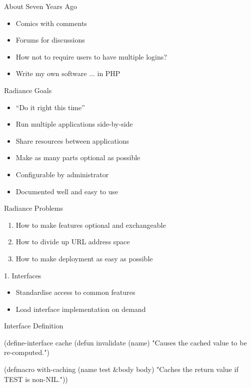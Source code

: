 \documentclass[14pt,t]{beamer}
\renewcommand{\title}[1]{
  {\huge #1} \vskip 0.4cm
}
\begin{document}
\begin{frame}
  \title{About Seven Years Ago}
  \begin{itemize}
  \item Comics with comments
  \item Forums for discussions
  \item How not to require users to have multiple logins?
  \item Write my own software \pause ... in PHP
  \end{itemize}
\end{frame}

\begin{frame}
  \title{Radiance Goals}
  \begin{itemize}
  \item ``Do it right this time''
  \item Run multiple applications side-by-side
  \item Share resources between applications
  \item Make as many parts optional as possible
  \item Configurable by administrator
  \item Documented well and easy to use
  \end{itemize}
\end{frame}

\begin{frame}
  \title{Radiance Problems}
  \begin{enumerate}
  \item How to make features optional and exchangeable
  \item How to divide up URL address space
  \item How to make deployment as easy as possible
  \end{enumerate}
\end{frame}

\begin{frame}
  \title{1. Interfaces}
  \begin{itemize}
  \item Standardise access to common features
  \item Load interface implementation on demand
  \end{itemize}
\end{frame}

\begin{frame}[fragile]
  \title{Interface Definition}
\begin{lispcode}
(define-interface cache
  (defun invalidate (name)
    "Causes the cached value to be re-computed.")

  (defmacro with-caching (name test &body body)
    "Caches the return value if TEST is non-NIL."))
\end{lispcode}
\end{frame}
\end{document}
